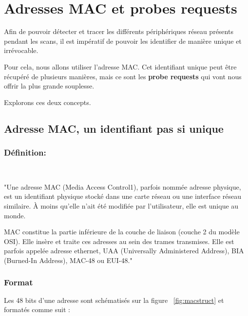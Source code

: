 \chapter{Adresses MAC et probes requests}
\label{ch:probe_req}

Afin de pouvoir détecter et tracer les différents périphériques réseau présents
pendant les scans, il est impératif de pouvoir les identifier de manière unique et irrévocable.

Pour cela, nous allons utiliser l'adresse MAC. 
Cet identifiant unique peut être récupéré de plusieurs manières, mais ce sont les \textbf{probe requests}
qui vont nous offrir la plus grande souplesse. 

Explorons ces deux concepts.

\section{Adresse MAC, un identifiant pas si unique}

\subsection{Définition:}~\cite{wiki:mac}

"Une adresse MAC (Media Access Control1), parfois nommée adresse physique, est un identifiant physique 
stocké dans une carte réseau ou une interface réseau similaire. À moins qu'elle n'ait été modifiée par l'utilisateur, elle est unique au monde. 

MAC constitue la partie inférieure de la couche de liaison (couche 2 du modèle OSI). Elle insère et traite ces adresses au sein des trames transmises. Elle est parfois appelée adresse ethernet, 
UAA (Universally Administered Address), BIA (Burned-In Address), MAC-48 ou EUI-48."

\subsection{Format}

Les 48 bits d'une adresse sont schématisés sur la figure ~\ref{fig:macstruct} et formatés comme suit :

